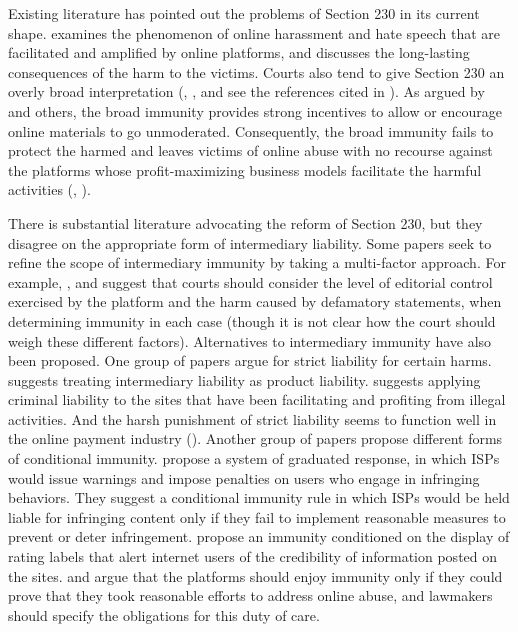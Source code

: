 Existing literature has pointed out the problems of Section 230 in its current shape. 
\cite{citron2014hate} examines the phenomenon of online harassment and hate speech that are facilitated and amplified by online platforms, and discusses the long-lasting consequences of the harm to the victims. 
Courts also tend to give Section 230 an overly broad interpretation (\cite{benedict2008deafening}, \cite{ferris2010communication}, and see the references cited in \cite{reidenberg2012section}). 
As argued by \cite{tushnet2010attention} and others, the broad immunity provides strong incentives to allow or encourage online materials to go unmoderated. Consequently, the broad immunity fails to protect the harmed and leaves victims of online abuse with no recourse against the platforms whose profit-maximizing business models facilitate the harmful activities (\cite{citron2018problem}, \cite{bartow2009internet}).


There is substantial literature advocating the reform of Section 230, but they disagree on the appropriate form of intermediary liability.
Some papers seek to refine the scope of intermediary immunity by taking a multi-factor approach. For example, \cite{lee2004batzel}, \cite{defterderian2009fair} and \cite{browne2015losing} suggest that courts should consider the level of editorial control exercised by the platform and the harm caused by defamatory statements, when determining immunity in each case (though it is not clear how the court should weigh these different factors).
Alternatives to intermediary immunity have also been proposed. 
One group of papers argue for strict liability for certain harms. 
\cite{kim2008imposing} suggests treating intermediary liability as product liability. \cite{radbod2010craigslist} suggests applying criminal liability to the sites that have been facilitating and profiting from illegal activities. And the harsh punishment of strict liability seems to function well in the online payment industry (\cite{maccarthy2010payment}). 
Another group of papers propose different forms of conditional immunity.
\cite{lichtman2006holding} propose a system of graduated response, in which ISPs would issue warnings and impose penalties on users who engage in infringing behaviors. They suggest a conditional immunity rule in which ISPs would be held liable for infringing content only if they fail to implement reasonable measures to prevent or deter infringement.
\cite{hall2008regulatory} propose an immunity conditioned on the display of rating labels that alert internet users of the credibility of information posted on the sites. 
\cite{citronwittes} and \cite{citron2022fix} argue that the platforms should enjoy immunity only if they could prove that they took reasonable efforts to address online abuse, and lawmakers should specify the obligations for this duty of care. 




